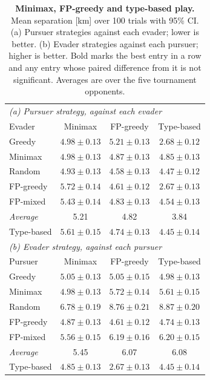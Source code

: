 \documentclass[letterpaper, 10 pt, conference]{ieeeconf}  %
\begin{document}
\begin{table}[!t]
\centering
\caption{\textbf{Minimax, FP-greedy and type-based play.} Mean separation [km] over 100 trials with 95\% CI. (a) Pursuer strategies against each evader; lower is better. (b) Evader strategies against each pursuer; higher is better. Bold marks the best entry in a row and any entry whose paired difference from it is not significant. Averages are over the five tournament opponents.}
\setlength{\tabcolsep}{3.5pt}
\begin{tabular}{lccc}
\toprule
\multicolumn{4}{l}{\textit{(a) Pursuer strategy, against each evader}} \\
Evader & Minimax & FP-greedy & Type-based \\
\midrule
Greedy    & $4.98 \pm 0.13$ & $5.21 \pm 0.13$ & $\mathbf{2.68 \pm 0.12}$ \\
Minimax   & $4.98 \pm 0.13$ & $\mathbf{4.87 \pm 0.13}$ & $\mathbf{4.85 \pm 0.13}$ \\
Random    & $4.93 \pm 0.13$ & $4.58 \pm 0.13$ & $\mathbf{4.47 \pm 0.12}$ \\
FP-greedy & $5.72 \pm 0.14$ & $4.61 \pm 0.12$ & $\mathbf{2.67 \pm 0.13}$ \\
FP-mixed  & $5.43 \pm 0.14$ & $4.83 \pm 0.13$ & $\mathbf{4.54 \pm 0.13}$ \\
\textit{Average} & 5.21 & 4.82 & 3.84 \\
Type-based & $5.61 \pm 0.15$ & $4.74 \pm 0.13$ & $\mathbf{4.45 \pm 0.14}$ \\
\midrule
\multicolumn{4}{l}{\textit{(b) Evader strategy, against each pursuer}} \\
Pursuer & Minimax & FP-greedy & Type-based \\
\midrule
Greedy    & $\mathbf{5.05 \pm 0.13}$ & $\mathbf{5.05 \pm 0.15}$ & $\mathbf{4.98 \pm 0.13}$ \\
Minimax   & $4.98 \pm 0.13$ & $\mathbf{5.72 \pm 0.14}$ & $5.61 \pm 0.15$ \\
Random    & $6.78 \pm 0.19$ & $\mathbf{8.76 \pm 0.21}$ & $\mathbf{8.87 \pm 0.20}$ \\
FP-greedy & $\mathbf{4.87 \pm 0.13}$ & $4.61 \pm 0.12$ & $4.74 \pm 0.13$ \\
FP-mixed  & $5.56 \pm 0.15$ & $\mathbf{6.19 \pm 0.16}$ & $\mathbf{6.20 \pm 0.15}$ \\
\textit{Average} & 5.45 & 6.07 & 6.08 \\
Type-based & $\mathbf{4.85 \pm 0.13}$ & $2.67 \pm 0.13$ & $4.45 \pm 0.14$ \\
\bottomrule
\end{tabular}
\label{tab:types}
\end{table}
\end{document}

